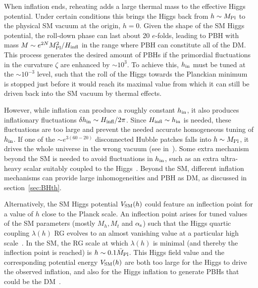 When inflation ends, reheating adds a large thermal mass to the effective Higgs potential.
Under certain conditions this brings the Higgs back from $h \sim M_{\rm Pl}$ to the physical SM vacuum at the origin, $h=0$.
Given the shape of the SM Higgs potential, the roll-down phase can last about 20 $e$-folds,
leading to PBH with mass $M \sim e^{2N} {M}_{\rm Pl}^2/H_{\rm infl}$ in the range where PBH can constitute all of the DM.
This process generates the desired amount of PBHs 
if the primordial fluctuations in the curvature $\zeta$  are enhanced by $\sim 10^3$.
To achieve this, $h_{\rm in}$  must be tuned at the  $ \sim 10^{-3}$ level, 
such that the roll of the Higgs towards the Planckian minimum
is stopped just before it would reach its maximal value from which it can still be driven back into the SM vacuum by thermal effects.

However, while inflation can produce a roughly constant $h_{\rm in}$, 
it also produces inflationary fluctuations $\delta h_{\rm in} \sim H_{\rm infl}/2\pi $.
Since $H_{\rm infl}\sim h_{\rm in}$ is needed,
these fluctuations are too large  and prevent the needed accurate homogeneous tuning of $h_{\rm in}$.
If one of the $\sim e^{3(60-20)}$ disconnected Hubble patches falls into $h \sim M_{\rm Pl}$,
it drives the whole universe in the wrong vacuum (see  in~\cite{PBHformationTh}).
Some extra mechanism beyond the SM is needed to avoid fluctuations in $h_{\rm in}$,
such as an extra ultra-heavy scalar suitably coupled to the Higgs~\cite{PBHformationTh}.
Beyond the SM, different inflation mechanisms can provide large inhomogeneities and PBH as DM, as discussed in section~\ref{sec:BHth}.


\medskip


Alternatively, the SM Higgs potential $V_{\rm SM}(h)$ could feature an inflection point for a value of $h$ close to the Planck scale.
An inflection point arises for tuned values of the SM parameters (mostly $M_h, M_t$ and $\alpha_{\rm s}$)
such that the Higgs quartic coupling $\lambda(h)$ RG evolves to an almost vanishing value at a particular high scale~\cite{HiggsPlateau}.
In the SM, the RG scale at which $\lambda(h)$ is minimal (and thereby
the inflection point is reached) is $h \sim 0.1 \bar{M}_{\rm Pl}$. This Higgs field value and the corresponding potential energy $V_{\rm SM}(h)$  are both  too large for the Higgs to drive the observed
inflation, and also for the Higgs inflation to  generate PBHs  that could be the DM~\cite{HiggsPlateau}.




